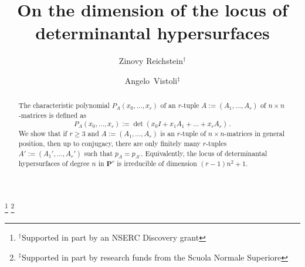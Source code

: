 \documentclass[12pt]{amsart}
\numberwithin{equation}{section}
\numberwithin{subsection}{section}
\theoremstyle{definition} \newtheorem{definition}[theorem]{Definition}
\newcommand\bP{\mathbf{P}} \newcommand\bQ{\mathbf{Q}} \newcommand\bR{\mathbf{R}}
\begin{document}
\title[Determinantal hypersurfaces]
{On the dimension of the locus of\\determinantal 
hypersurfaces}

\author[Reichstein]{Zinovy Reichstein$^\dagger$}

\author[Vistoli]{Angelo~Vistoli$^\ddagger$}

\address[Reichstein]{Department of Mathematics\\ University of British
Columbia \\ Vancouver, B.C., Canada V6T 1Z2}

\address[Vistoli]{Scuola Normale Superiore\\ Piazza dei Cavalieri 7\\ 56126
Pisa\\ Italy}

\begin{abstract} The characteristic polynomial $P_A(x_0, \dots, x_r)$
of an $r$-tuple $A := (A_1, \dots, A_r)$ of $n \times n$-matrices is 
defined as
\[ P_A(x_0, \dots, x_r) := \det(x_0 I + x_1 A_1 + \dots + x_r A_r) \, . \]
We show that if $r \geqslant 3$
and $A := (A_1, \dots, A_r)$ is an $r$-tuple of $n \times n$-matrices 
in general position,
then up to conjugacy, there are only finitely many $r$-tuples 
 $A' := (A_1', \dots, A_r')$ such that $p_A = p_{A'}$. Equivalently,
the locus of determinantal hypersurfaces of degree $n$ in $\bP^r$
is irreducible of dimension $(r-1)n^2 + 1$.
\end{abstract}




\thanks{$^\dagger$Supported in part by an NSERC Discovery grant}
\thanks{$^\ddagger$Supported in part by research funds from 
the Scuola Normale Superiore}


\maketitle

\setcounter{tocdepth}{1} 
\end{document}
